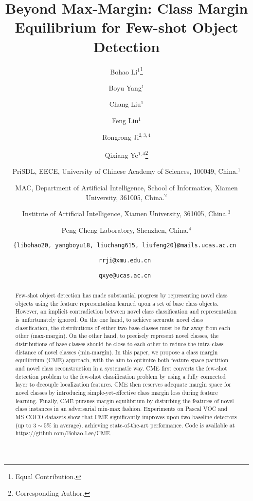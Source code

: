 \documentclass[final]{cvpr}
\begin{document}
\title{Beyond Max-Margin: Class Margin Equilibrium for Few-shot Object Detection}

\author{Bohao Li$^{1}$\thanks{Equal Contribution.} \and Boyu Yang$^{1}$\footnotemark[1] \and Chang Liu$^1$ \and Feng Liu$^1$ \and Rongrong Ji$^{2,3,4}$ \and Qixiang Ye$^{1,4}$\thanks{Corresponding Author.}
\and PriSDL, EECE, University of Chinese Academy of Sciences, 100049, China.$^1$  \and  MAC, Department of Artificial Intelligence, School of Informatics, Xiamen University, 361005, China.$^2$ \and Institute of Artificial Intelligence, Xiamen University, 361005, China.$^3$ \and Peng Cheng Laboratory, Shenzhen, China.$^4$

\and\tt\small \{libohao20, yangboyu18, liuchang615, liufeng20\}@mails.ucas.ac.cn 
\and\tt\small rrji@xmu.edu.cn \and\tt\small qxye@ucas.ac.cn
}

\maketitle


\begin{abstract}
Few-shot object detection has made substantial progress by representing novel class objects using the feature representation learned upon a set of base class objects.
However, an implicit contradiction between novel class classification and representation is unfortunately ignored.
On the one hand, to achieve accurate novel class classification, the distributions of either two base classes must be far away from each other (max-margin).
On the other hand, to precisely represent novel classes, the distributions of base classes should be close to each other to reduce the intra-class distance of novel classes (min-margin).
In this paper, we propose a class margin equilibrium (CME) approach, with the aim to optimize both feature space partition and novel class reconstruction in a systematic way.
CME first converts the few-shot detection problem to the few-shot classification problem by using a fully connected layer to decouple localization features.
CME then reserves adequate margin space for novel classes by introducing simple-yet-effective class margin loss during feature learning.
Finally, CME pursues margin equilibrium by disturbing the features of novel class instances in an adversarial min-max fashion.
Experiments on Pascal VOC and MS-COCO datasets show that CME significantly improves upon two baseline detectors (up to $3\sim5\%$ in average), achieving state-of-the-art performance. Code is available at \href{https://github.com/Bohao-Lee/CME}{\color{magenta}https://github.com/Bohao-Lee/CME}.

\end{abstract}
\end{document}
